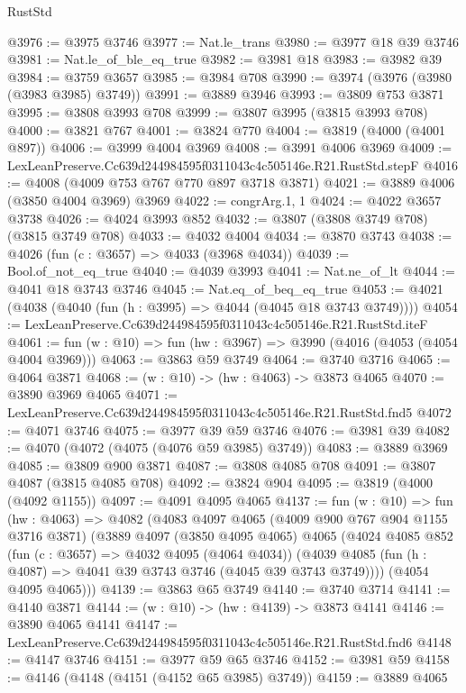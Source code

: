 \begin{lexlean}{RustStd}
\begin{coremodule}
@3976 := @3975 @3746
@3977 := Nat.le_trans
@3980 := @3977 @18 @39 @3746
@3981 := Nat.le_of_ble_eq_true
@3982 := @3981 @18
@3983 := @3982 @39
@3984 := @3759 @3657
@3985 := @3984 @708
@3990 := @3974 (@3976 (@3980 (@3983 @3985) @3749))
@3991 := @3889 @3946
@3993 := @3809 @753 @3871
@3995 := @3808 @3993 @708
@3999 := @3807 @3995 (@3815 @3993 @708)
@4000 := @3821 @767
@4001 := @3824 @770
@4004 := @3819 (@4000 (@4001 @897))
@4006 := @3999 @4004 @3969
@4008 := @3991 @4006 @3969
@4009 := LexLeanPreserve.Cc639d244984595f0311043c4c505146e.R21.RustStd.stepF
@4016 := @4008 (@4009 @753 @767 @770 @897 @3718 @3871)
@4021 := @3889 @4006 (@3850 @4004 @3969) @3969
@4022 := congrArg.{1, 1}
@4024 := @4022 @3657 @3738
@4026 := @4024 @3993 @852
@4032 := @3807 (@3808 @3749 @708) (@3815 @3749 @708)
@4033 := @4032 @4004
@4034 := @3870 @3743
@4038 := @4026 (fun (c : @3657) => @4033 (@3968 @4034))
@4039 := Bool.of_not_eq_true
@4040 := @4039 @3993
@4041 := Nat.ne_of_lt
@4044 := @4041 @18 @3743 @3746
@4045 := Nat.eq_of_beq_eq_true
@4053 := @4021 (@4038 (@4040 (fun (h : @3995) => @4044 (@4045 @18 @3743 @3749))))
@4054 := LexLeanPreserve.Cc639d244984595f0311043c4c505146e.R21.RustStd.iteF
@4061 := fun (w : @10) => fun (hw : @3967) => @3990 (@4016 (@4053 (@4054 @4004 @3969)))
@4063 := @3863 @59 @3749
@4064 := @3740 @3716
@4065 := @4064 @3871
@4068 := (w : @10) -> (hw : @4063) -> @3873 @4065
@4070 := @3890 @3969 @4065
@4071 := LexLeanPreserve.Cc639d244984595f0311043c4c505146e.R21.RustStd.fnd5
@4072 := @4071 @3746
@4075 := @3977 @39 @59 @3746
@4076 := @3981 @39
@4082 := @4070 (@4072 (@4075 (@4076 @59 @3985) @3749))
@4083 := @3889 @3969
@4085 := @3809 @900 @3871
@4087 := @3808 @4085 @708
@4091 := @3807 @4087 (@3815 @4085 @708)
@4092 := @3824 @904
@4095 := @3819 (@4000 (@4092 @1155))
@4097 := @4091 @4095 @4065
@4137 := fun (w : @10) =>
  fun (hw : @4063) =>
  @4082
    (@4083
      @4097
      @4065
      (@4009 @900 @767 @904 @1155 @3716 @3871)
      (@3889
        @4097
        (@3850 @4095 @4065)
        @4065
        (@4024
          @4085
          @852
          (fun (c : @3657) => @4032 @4095 (@4064 @4034))
          (@4039 @4085 (fun (h : @4087) => @4041 @39 @3743 @3746 (@4045 @39 @3743 @3749))))
        (@4054 @4095 @4065)))
@4139 := @3863 @65 @3749
@4140 := @3740 @3714
@4141 := @4140 @3871
@4144 := (w : @10) -> (hw : @4139) -> @3873 @4141
@4146 := @3890 @4065 @4141
@4147 := LexLeanPreserve.Cc639d244984595f0311043c4c505146e.R21.RustStd.fnd6
@4148 := @4147 @3746
@4151 := @3977 @59 @65 @3746
@4152 := @3981 @59
@4158 := @4146 (@4148 (@4151 (@4152 @65 @3985) @3749))
@4159 := @3889 @4065

\end{coremodule}
\end{lexlean}
